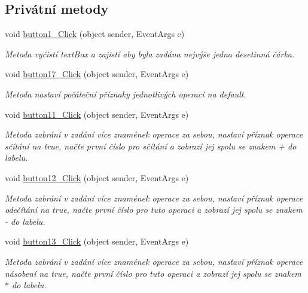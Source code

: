 \subsection*{Privátní metody}
\begin{DoxyCompactItemize}
\item 
void \hyperlink{class_windows_forms_application7_1_1_form1_a3d30a8143ce023ef6241f6e3b9f0a933}{button1\+\_\+\+Click} (object sender, Event\+Args e)
\begin{DoxyCompactList}\small\item\em Metoda vyčistí text\+Box a zajistí aby byla zadána nejvýše jedna desetinná čárka. \end{DoxyCompactList}\item 
void \hyperlink{class_windows_forms_application7_1_1_form1_ad911bf5bdbec7c25585694c4c1520cd6}{button17\+\_\+\+Click} (object sender, Event\+Args e)
\begin{DoxyCompactList}\small\item\em Metoda nastaví počáteční příznaky jednotlivých operací na default. \end{DoxyCompactList}\item 
void \hyperlink{class_windows_forms_application7_1_1_form1_a4f79ca83e4dc1e9bcd343a5cb3a86273}{button11\+\_\+\+Click} (object sender, Event\+Args e)
\begin{DoxyCompactList}\small\item\em Metoda zabrání v zadání více znamének operace za sebou, nastaví příznak operace sčítání na true, načte první číslo pro sčítání a zobrazí jej spolu se znakem \textquotesingle{}+\textquotesingle{} do labelu. \end{DoxyCompactList}\item 
void \hyperlink{class_windows_forms_application7_1_1_form1_ad550bcffb060db5fbddc045e6a0e81f7}{button12\+\_\+\+Click} (object sender, Event\+Args e)
\begin{DoxyCompactList}\small\item\em Metoda zabrání v zadání více znamének operace za sebou, nastaví příznak operace odečítání na true, načte první číslo pro tuto operaci a zobrazí jej spolu se znakem \textquotesingle{}-\/\textquotesingle{} do labelu. \end{DoxyCompactList}\item 
void \hyperlink{class_windows_forms_application7_1_1_form1_a70b0c4d24d34b89e6b1303d95fb0617f}{button13\+\_\+\+Click} (object sender, Event\+Args e)
\begin{DoxyCompactList}\small\item\em Metoda zabrání v zadání více znamének operace za sebou, nastaví příznak operace násobení na true, načte první číslo pro tuto operaci a zobrazí jej spolu se znakem \textquotesingle{}$\ast$\textquotesingle{} do labelu. \end{DoxyCompactList}\item 

\end{DoxyCompactItemize}

